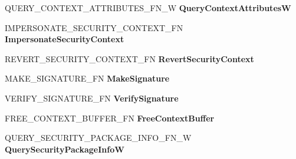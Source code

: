 \begin{DoxyCompactItemize}
Q\+U\+E\+R\+Y\+\_\+\+C\+O\+N\+T\+E\+X\+T\+\_\+\+A\+T\+T\+R\+I\+B\+U\+T\+E\+S\+\_\+\+F\+N\+\_\+W {\bfseries Query\+Context\+AttributesW}
\item 
\mbox{\label{struct___s_e_c_u_r_i_t_y___f_u_n_c_t_i_o_n___t_a_b_l_e___w_af81873cbd3ddbf8338c1a772f9fed6b7}} 
I\+M\+P\+E\+R\+S\+O\+N\+A\+T\+E\+\_\+\+S\+E\+C\+U\+R\+I\+T\+Y\+\_\+\+C\+O\+N\+T\+E\+X\+T\+\_\+\+FN {\bfseries Impersonate\+Security\+Context}
\item 
\mbox{\label{struct___s_e_c_u_r_i_t_y___f_u_n_c_t_i_o_n___t_a_b_l_e___w_ab6e380604ab340964fe85853ec4c931f}} 
R\+E\+V\+E\+R\+T\+\_\+\+S\+E\+C\+U\+R\+I\+T\+Y\+\_\+\+C\+O\+N\+T\+E\+X\+T\+\_\+\+FN {\bfseries Revert\+Security\+Context}
\item 
\mbox{\label{struct___s_e_c_u_r_i_t_y___f_u_n_c_t_i_o_n___t_a_b_l_e___w_ac04688d8b1f28cf827eaa7b2be795c9b}} 
M\+A\+K\+E\+\_\+\+S\+I\+G\+N\+A\+T\+U\+R\+E\+\_\+\+FN {\bfseries Make\+Signature}
\item 
\mbox{\label{struct___s_e_c_u_r_i_t_y___f_u_n_c_t_i_o_n___t_a_b_l_e___w_a4736706fa020c94c62c58269cec8f69b}} 
V\+E\+R\+I\+F\+Y\+\_\+\+S\+I\+G\+N\+A\+T\+U\+R\+E\+\_\+\+FN {\bfseries Verify\+Signature}
\item 
\mbox{\label{struct___s_e_c_u_r_i_t_y___f_u_n_c_t_i_o_n___t_a_b_l_e___w_aa2e6a9cec525b0bcf5e77f9f996bbb22}} 
F\+R\+E\+E\+\_\+\+C\+O\+N\+T\+E\+X\+T\+\_\+\+B\+U\+F\+F\+E\+R\+\_\+\+FN {\bfseries Free\+Context\+Buffer}
\item 
\mbox{\label{struct___s_e_c_u_r_i_t_y___f_u_n_c_t_i_o_n___t_a_b_l_e___w_a779a7e6d870320d255292ddb25d630fc}} 
Q\+U\+E\+R\+Y\+\_\+\+S\+E\+C\+U\+R\+I\+T\+Y\+\_\+\+P\+A\+C\+K\+A\+G\+E\+\_\+\+I\+N\+F\+O\+\_\+\+F\+N\+\_\+W {\bfseries Query\+Security\+Package\+InfoW}
\item 
\mbox{\label{struct___s_e_c_u_r_i_t_y___f_u_n_c_t_i_o_n___t_a_b_l_e___w_ac0be426bc4400111d0704563f7db4d22}} 

\end{DoxyCompactItemize}
